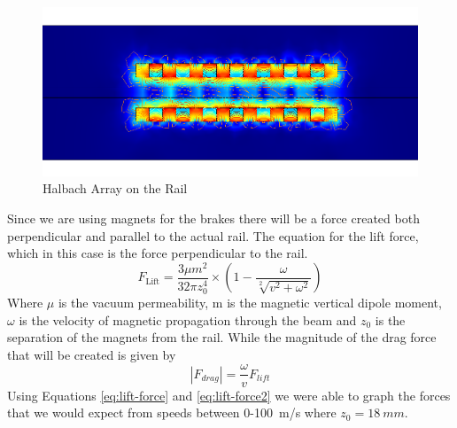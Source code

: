 \documentclass[main.tex]{subfiles}
\begin{document}
    \begin{figure}[H]
        \centering
        \includegraphics[width=\linewidth]{images/halbach_array.png}
        \caption{Halbach Array on the Rail}
        \label{fig:halbach-array}
    \end{figure}
     Since we are using magnets for the brakes there will be a force created both perpendicular and parallel to the actual rail. The equation for the lift force, which in this case is the force perpendicular to the rail.
     \begin{equation}\label{eq:lift-force}
     F_{\textrm{Lift}} = \frac{3\mu m^2}{32\pi z_0^4}\times\left(1 -\frac{\omega}{\sqrt[2]{v^2+\omega^2}}\right)
    \end{equation}
    Where $\mu$ is the vacuum permeability, m is the magnetic vertical dipole moment, $\omega$ is the velocity of magnetic propagation through the beam and $z_0$ is the separation of the magnets from the rail. While the magnitude of the drag force that will be created is given by
    \begin{equation}\label{eq:lift-force2}
    \left\lvert F_{drag}\right\rvert = \frac{\omega}{v} F_{lift}
    \end{equation}
     Using Equations \ref{eq:lift-force} and \ref{eq:lift-force2} we were able to graph the forces that we would expect from speeds between 0-\SI{100}{m/s} where $z_0 = \SI{18}{mm}$.\\
\end{document}
